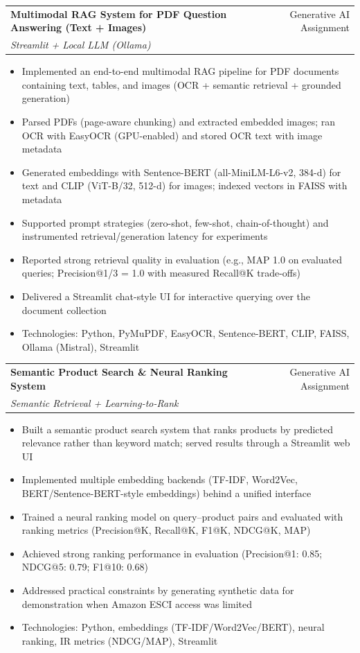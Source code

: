 \documentclass[a4paper,12pt]{article}
\makeatletter
\newenvironment{projectdetailed}[3]
    {
    \begin{tabularx}{\linewidth}{@{}l X r@{}}
    \textbf{#1} & \hfill & #2 \\
    \textit{#3} & & \\[3.75pt]
    \end{tabularx}
    \begin{minipage}[t]{\linewidth}
    \begin{itemize}[nosep,after=\strut, leftmargin=1em, itemsep=2pt,label=--]
    }
    {
    \end{itemize}
    \end{minipage}
    \vspace{6pt}
    }
\makeatother
\begin{document}
\begin{projectdetailed}{Multimodal RAG System for PDF Question Answering (Text + Images)}{Generative AI Assignment}{Streamlit + Local LLM (Ollama)}
\item Implemented an end-to-end multimodal RAG pipeline for PDF documents containing text, tables, and images (OCR + semantic retrieval + grounded generation)
\item Parsed PDFs (page-aware chunking) and extracted embedded images; ran OCR with EasyOCR (GPU-enabled) and stored OCR text with image metadata
\item Generated embeddings with Sentence-BERT (all-MiniLM-L6-v2, 384-d) for text and CLIP (ViT-B/32, 512-d) for images; indexed vectors in FAISS with metadata
\item Supported prompt strategies (zero-shot, few-shot, chain-of-thought) and instrumented retrieval/generation latency for experiments
\item Reported strong retrieval quality in evaluation (e.g., MAP 1.0 on evaluated queries; Precision@1/3 = 1.0 with measured Recall@K trade-offs)
\item Delivered a Streamlit chat-style UI for interactive querying over the document collection
\item Technologies: Python, PyMuPDF, EasyOCR, Sentence-BERT, CLIP, FAISS, Ollama (Mistral), Streamlit
\end{projectdetailed}

\begin{projectdetailed}{Semantic Product Search \& Neural Ranking System}{Generative AI Assignment}{Semantic Retrieval + Learning-to-Rank}
\item Built a semantic product search system that ranks products by predicted relevance rather than keyword match; served results through a Streamlit web UI
\item Implemented multiple embedding backends (TF-IDF, Word2Vec, BERT/Sentence-BERT-style embeddings) behind a unified interface
\item Trained a neural ranking model on query--product pairs and evaluated with ranking metrics (Precision@K, Recall@K, F1@K, NDCG@K, MAP)
\item Achieved strong ranking performance in evaluation (Precision@1: 0.85; NDCG@5: 0.79; F1@10: 0.68)
\item Addressed practical constraints by generating synthetic data for demonstration when Amazon ESCI access was limited
\item Technologies: Python, embeddings (TF-IDF/Word2Vec/BERT), neural ranking, IR metrics (NDCG/MAP), Streamlit
\end{projectdetailed}
\end{document}
